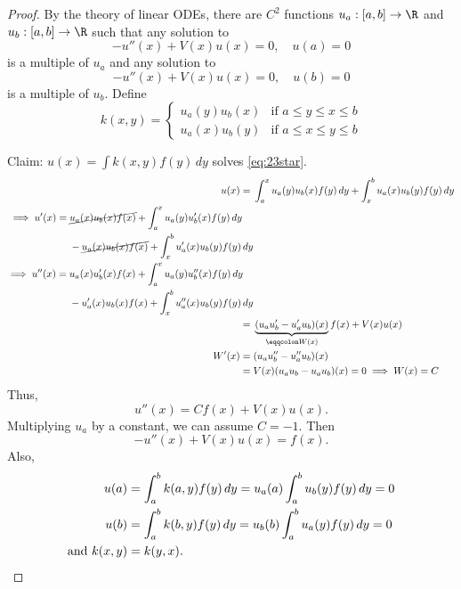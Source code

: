 \documentclass{article}
\begin{document}
\begin{proof}
    By the theory of linear ODEs, there are $C^2$ functions $u_a:[a,b] \to \R$ and $u_b:[a,b] \to \R$ such that any solution to
    \begin{equation*}
        -u''(x) + V(x) u(x) = 0, \quad u(a) = 0
    \end{equation*}
    is a multiple of $u_a$ and any solution to
    \begin{equation*}
        -u''(x) + V(x) u(x) = 0, \quad u(b) = 0
    \end{equation*}
    is a multiple of $u_b$. Define
    \begin{equation*}
        k(x,y) =
        \begin{cases}
            u_a(y) u_b(x) & \text{if } a \leq y \leq x \leq b \\
            u_a(x) u_b(y) & \text{if } a \leq x \leq y \leq b
        \end{cases}
    \end{equation*}

    Claim: $u(x) = \int k(x,y) f(y) \, dy$ solves \eqref{eq:23star}.
    \begin{align*}
        u(x) ={}& \int_a^x u_a(y) u_b(x) f(y) \, dy + \int_x^b u_a(x) u_b(y) f(y) \, dy \\
        \begin{split}
            \implies u'(x) ={}& \cancel{u_a(x) u_b(x) f(x)} + \int_a^x u_a(y) u_b'(x) f(y) \, dy \\
                              &-\cancel{u_a(x) u_b(x) f(x)} + \int_x^b u_a'(x) u_b(y) f(y) \, dy
        \end{split} \\
        \begin{split}
            \implies u''(x) ={}& u_a(x) u_b'(x) f(x) + \int_a^x u_a(y) u_b''(x) f(y) \, dy \\
                               &-u_a'(x) u_b(x) f(x) + \int_x^b u_a''(x) u_b(y) f(y) \, dy
        \end{split} \\
        ={}& \underbrace{(u_a u_b' - u_a' u_b)(x)}_{\eqqcolon W(x)} f(x) + V(x) u(x) \\
        W'(x) ={}& (u_a u_b'' - u_a'' u_b)(x) \\
              ={}& V(x) (u_a u_b - u_a u_b)(x) = 0 \implies W(x) = C
    \end{align*}
    Thus,
    \begin{equation*}
        u''(x) = C f(x) + V(x) u(x).
    \end{equation*}
    Multiplying $u_a$ by a constant, we can assume $C=-1$. Then
    \begin{equation*}
        -u''(x) + V(x) u(x) = f(x).
    \end{equation*}
    Also,
    \begin{align*}
        u(a) &= \int_a^b k(a,y) f(y) \, dy = u_a(a) \int_a^b u_b(y) f(y) \, dy = 0 \\
        u(b) &= \int_a^b k(b,y) f(y) \, dy = u_b(b) \int_a^b u_a(y) f(y) \, dy = 0 \\
        \text{and } k(x,y) &= k(y,x). \qedhere
    \end{align*}
\end{proof}
\end{document}
